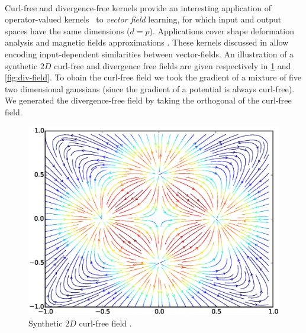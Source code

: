 \paragraph{}
Curl-free and divergence-free kernels provide an interesting application of
operator-valued kernels~\citep{Macedo2008, Baldassare2012, Micheli2013} to
\emph{vector field} learning, for which input and output spaces have the same
dimensions ($d=p$). Applications cover shape deformation
analysis \citep{Micheli2013} and magnetic fields
approximations \citep{Wahlstrom2013}. These kernels discussed in
\citep{Fuselier2006} allow encoding input-dependent similarities between
vector-fields. An illustration of a synthetic $2D$ curl-free and divergence
free fields are given respectively in \cref{fig:curl-field} and
\cref{fig:div-field}. To obain the curl-free field we took the gradient of
a mixture of five two dimensional gaussians (since the gradient of a potential
is always curl-free). We generated the divergence-free field by taking the
orthogonal of the curl-free field.
\begin{figure}
    \centering
    \includegraphics[trim=1.8cm 1cm 2cm 1cm,width=\textwidth,clip=true]{./gfx/curl_field.eps}
    \caption{Synthetic $2D$ curl-free field \label{fig:curl-field}.}
\end{figure}
